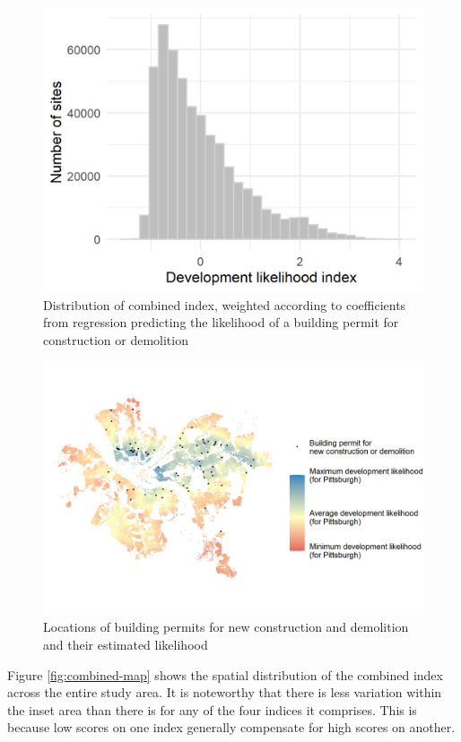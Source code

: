 \documentclass[
]{book}
\begin{document}
\begin{figure}
\includegraphics[width=1\linewidth]{04_figures/combined-hist} \caption{Distribution of combined index, weighted according to coefficients from regression predicting the likelihood of a building permit for construction or demolition}\label{fig:combined-hist}
\end{figure}

\begin{figure}
\includegraphics[width=1\linewidth]{04_figures/combined-pitt} \caption{Locations of building permits for new construction and demolition and their estimated likelihood}\label{fig:combined-pitt}
\end{figure}

Figure \ref{fig:combined-map} shows the spatial distribution of the combined index
across the entire study area. It is noteworthy that there is less variation within
the inset area than there is for any of the four indices it comprises. This is because
low scores on one index generally compensate for high scores on another.
\end{document}
